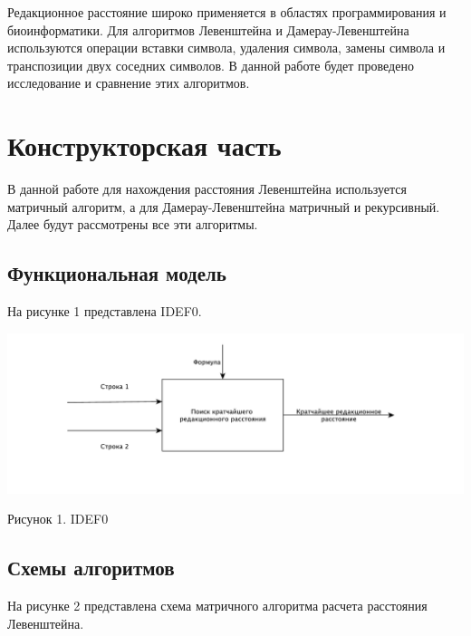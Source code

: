 \documentclass[a4paper,12pt]{article}
\begin{document}
Редакционное расстояние широко применяется в областях программирования и
биоинформатики. Для алгоритмов Левенштейна и Дамерау-Левенштейна
используются операции вставки символа, удаления символа, замены символа и
транспозиции двух соседних символов. В данной работе будет проведено
исследование и сравнение этих алгоритмов.

\newpage
\section{Конструкторская часть}

В данной работе для нахождения расстояния Левенштейна используется матричный
алгоритм, а для Дамерау-Левенштейна матричный и рекурсивный. Далее будут
рассмотрены все эти алгоритмы.

\subsection{Функциональная модель}

На рисунке 1 представлена IDEF0.

\begin{center}
    \includegraphics[scale=0.5]{IDEF0}

    Рисунок 1. IDEF0
\end{center}

\subsection{Схемы алгоритмов}

На рисунке 2 представлена схема матричного алгоритма расчета расстояния Левенштейна.
\end{document}
